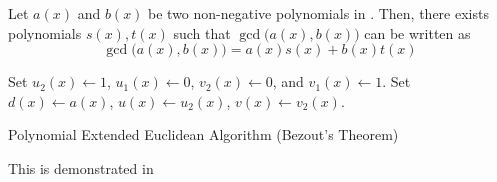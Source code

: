 \newpage
\begin{definition}\label{def:Polynomial_Extended_Euclidean_Algorithm}
  Let $a(x)$ and $b(x)$ be two non-negative polynomials in .
  Then, there exists polynomials $s(x), t(x)$ such that $\gcd \bigl( a(x), b(x) \bigr)$ can be written as
  \begin{equation}\label{eq:Polynomial_Extended_Euclidean_Algorithm}
    \gcd \bigl( a(x), b(x) \bigr) = a(x) s(x) + b(x) t(x)
  \end{equation}

    \begin{algorithm}[H]
    \DontPrintSemicolon{}

    \BlankLine{}

    Set $u_{2}(x) \leftarrow 1$, $u_{1}(x) \leftarrow 0$, $v_{2}(x) \leftarrow 0$, and $v_{1}(x) \leftarrow 1$. \;
    Set $d(x) \leftarrow a(x)$, $u(x) \leftarrow u_{2}(x)$, $v(x) \leftarrow v_{2}(x)$. \;
    \caption{Polynomial Extended Euclidean Algorithm (Bezout's Theorem)}
    \label{algo:Polynomial_Extended_Euclidean_Algorithm}
  \end{algorithm}

  This is demonstrated in 
\end{definition}

